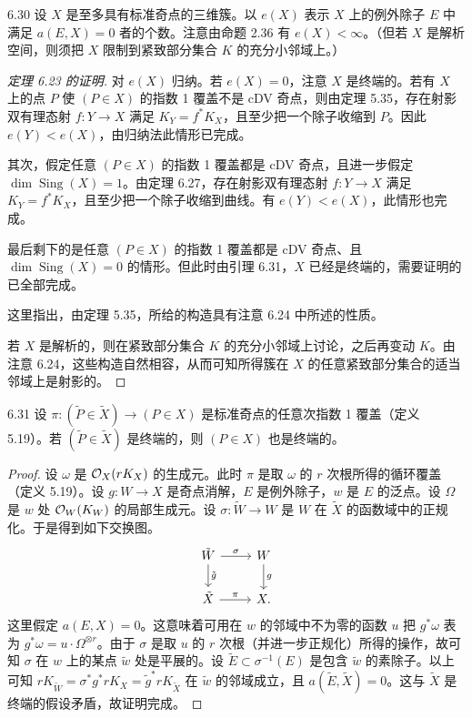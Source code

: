 \begin{definition}{6.30}
设 $X$ 是至多具有标准奇点的三维簇。以 $e(X)$ 表示 $X$ 上的例外除子 $E$ 中满足 $a(E,X)=0$ 者的个数。注意由命题 2.36 有 $e(X)<\infty$。（但若 $X$ 是解析空间，则须把 $X$ 限制到紧致部分集合 $K$ 的充分小邻域上。）
\end{definition}

\begin{proof}[定理 6.23 的证明]
对 $e(X)$ 归纳。若 $e(X)=0$，注意 $X$ 是终端的。若有 $X$ 上的点 $P$ 使 $(P\in X)$ 的指数 1 覆盖不是 cDV 奇点，则由定理 5.35，存在射影双有理态射 $f:Y\to X$ 满足 $K_Y=f^*K_X$，且至少把一个除子收缩到 $P$。因此 $e(Y)<e(X)$，由归纳法此情形已完成。

其次，假定任意 $(P\in X)$ 的指数 1 覆盖都是 cDV 奇点，且进一步假定 $\dim\operatorname{Sing}(X)=1$。由定理 6.27，存在射影双有理态射 $f:Y\to X$ 满足 $K_Y=f^*K_X$，且至少把一个除子收缩到曲线。有 $e(Y)<e(X)$，此情形也完成。

最后剩下的是任意 $(P\in X)$ 的指数 1 覆盖都是 cDV 奇点、且 $\dim\operatorname{Sing}(X)=0$ 的情形。但此时由引理 6.31，$X$ 已经是终端的，需要证明的已全部完成。

这里指出，由定理 5.35，所给的构造具有注意 6.24 中所述的性质。

若 $X$ 是解析的，则在紧致部分集合 $K$ 的充分小邻域上讨论，之后再变动 $K$。由注意 6.24，这些构造自然相容，从而可知所得簇在 $X$ 的任意紧致部分集合的适当邻域上是射影的。
\end{proof}

\begin{lemmap}[{[Rei83b]}]{6.31}
设 $\pi:(\tilde P\in\tilde X)\to(P\in X)$ 是标准奇点的任意次指数 1 覆盖（定义 5.19）。若 $(\tilde P\in\tilde X)$ 是终端的，则 $(P\in X)$ 也是终端的。
\end{lemmap}

\begin{proof}
设 $\omega$ 是 $\mathcal{O}_X(rK_X)$ 的生成元。此时 $\pi$ 是取 $\omega$ 的 $r$ 次根所得的循环覆盖（定义 5.19）。设 $g:W\to X$ 是奇点消解，$E$ 是例外除子，$w$ 是 $E$ 的泛点。设 $\Omega$ 是 $w$ 处 $\mathcal{O}_W(K_W)$ 的局部生成元。设 $\sigma:\tilde W\to W$ 是 $W$ 在 $\tilde X$ 的函数域中的正规化。于是得到如下交换图。
\[
\begin{tikzcd}
\tilde W \arrow[r,"\sigma"] \arrow[d,"\tilde g"] & W \arrow[d,"g"] \\
\tilde X \arrow[r,"\pi"] & X.
\end{tikzcd}
\]
这里假定 $a(E,X)=0$。这意味着可用在 $w$ 的邻域中不为零的函数 $u$ 把 $g^*\omega$ 表为 $g^*\omega=u\cdot\Omega^{\otimes r}$。由于 $\sigma$ 是取 $u$ 的 $r$ 次根（并进一步正规化）所得的操作，故可知 $\sigma$ 在 $w$ 上的某点 $\tilde w$ 处是平展的。设 $\tilde E\subset\sigma^{-1}(E)$ 是包含 $\tilde w$ 的素除子。以上可知 $rK_{\tilde W}=\sigma^*g^*rK_X=\tilde g^*rK_{\tilde X}$ 在 $\tilde w$ 的邻域成立，且 $a(\tilde E,\tilde X)=0$。这与 $\tilde X$ 是终端的假设矛盾，故证明完成。
\end{proof}

